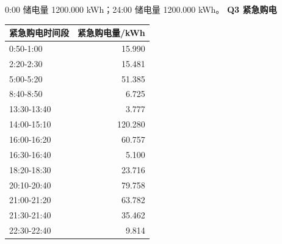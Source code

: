 0:00 储电量 1200.000 kWh；24:00 储电量 1200.000 kWh。
\textbf{Q3 紧急购电}
\begin{longtable}[]{@{}lr@{}}\toprule 紧急购电时间段 & 紧急购电量/kWh \\\midrule\endhead
0:50-1:00 & 15.990 \\
2:20-2:30 & 15.481 \\
5:00-5:20 & 51.385 \\
8:40-8:50 & 6.725 \\
13:30-13:40 & 3.777 \\
14:00-15:10 & 120.280 \\
16:00-16:20 & 60.757 \\
16:30-16:40 & 5.100 \\
18:20-18:30 & 23.716 \\
20:10-20:40 & 79.758 \\
21:00-21:20 & 63.782 \\
21:30-21:40 & 35.462 \\
22:30-22:40 & 9.814 \\
\bottomrule\end{longtable}

